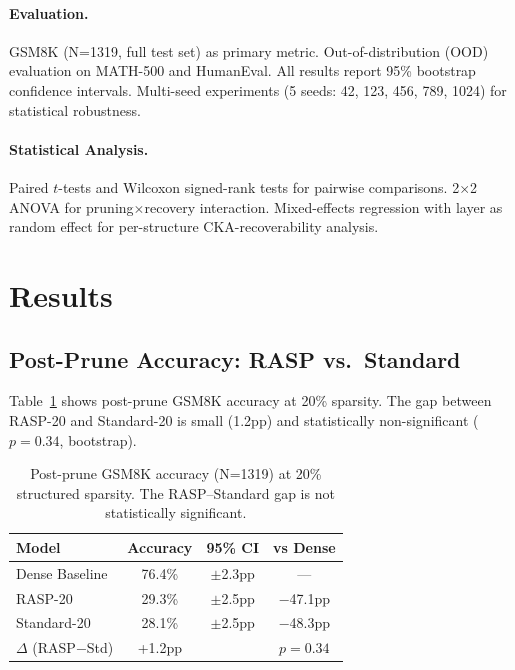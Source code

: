 \documentclass[11pt,a4paper]{article}
\begin{document}
\paragraph{Evaluation.} GSM8K (N=1319, full test set) as primary metric. Out-of-distribution (OOD) evaluation on MATH-500 and HumanEval. All results report 95\% bootstrap confidence intervals. Multi-seed experiments (5 seeds: 42, 123, 456, 789, 1024) for statistical robustness.

\paragraph{Statistical Analysis.} Paired $t$-tests and Wilcoxon signed-rank tests for pairwise comparisons. 2$\times$2 ANOVA for pruning$\times$recovery interaction. Mixed-effects regression with layer as random effect for per-structure CKA-recoverability analysis.


\section{Results}
\label{sec:results}

\subsection{Post-Prune Accuracy: RASP vs.\ Standard}
\label{sec:postprune}

Table~\ref{tab:postprune} shows post-prune GSM8K accuracy at 20\% sparsity. The gap between RASP-20 and Standard-20 is small (1.2pp) and statistically non-significant ($p{=}0.34$, bootstrap).

\begin{table}[t]
\centering
\small
\begin{tabular}{lccc}
\toprule
\textbf{Model} & \textbf{Accuracy} & \textbf{95\% CI} & \textbf{vs Dense} \\
\midrule
Dense Baseline & 76.4\% & $\pm$2.3pp & --- \\
RASP-20 & 29.3\% & $\pm$2.5pp & $-$47.1pp \\
Standard-20 & 28.1\% & $\pm$2.5pp & $-$48.3pp \\
$\Delta$ (RASP$-$Std) & +1.2pp & & $p{=}0.34$ \\
\bottomrule
\end{tabular}
\caption{Post-prune GSM8K accuracy (N=1319) at 20\% structured sparsity. The RASP--Standard gap is not statistically significant.}
\label{tab:postprune}
\end{table}
\end{document}

